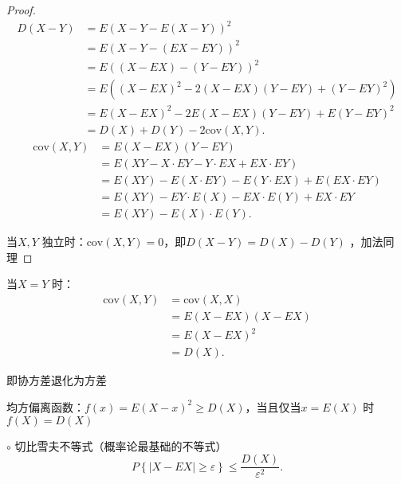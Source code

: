 \begin{proof}
    \begin{align*}
        D\left( X-Y \right) &=E\left( X-Y-E\left( X-Y \right)  \right) ^2\\
        &= E\left( X-Y-\left( EX-EY \right)  \right) ^2 \\
        &= E\left( \left( X-EX \right) -\left( Y-EY \right)  \right) ^2 \\
        &= E\left( \left( X-EX \right) ^2-2\left( X-EX \right) \left( Y-EY \right) +\left( Y-EY \right) ^2 \right)  \\
        &= E\left( X-EX \right) ^2 -2E\left( X-EX \right) \left( Y-EY \right) +E\left( Y-EY \right) ^2\\
        &= D\left( X \right) +D\left( Y \right) -2\text{cov}\left( X,Y \right)
    .\end{align*}
    \begin{align*}
        \text{cov}\left( X,Y \right) &= E\left( X-EX \right) \left( Y-EY \right)\\
        &= E\left( XY-X\cdot EY-Y\cdot EX+EX\cdot EY \right) \\
        &= E\left( XY \right) -E\left( X\cdot EY \right) -E\left( Y\cdot EX \right) +E\left( EX\cdot EY \right)  \\
        &= E\left( XY \right) -EY\cdot E\left( X \right) -EX\cdot E\left( Y \right)+EX\cdot EY  \\
        &= E\left( XY \right) -E\left( X \right) \cdot E\left( Y \right)
    .\end{align*}
    
    当$X,Y$ 独立时：$\text{cov}\left( X,Y \right) =0$，即$D\left( X-Y \right) =D\left( X \right) -D\left( Y \right) $ ，加法同理
\end{proof}
\begin{notation}
    当$X=Y$ 时：
    \begin{align*}
        \text{cov}\left( X,Y \right) &= \text{cov}\left( X,X \right) \\
        &= E\left( X-EX \right) \left( X-EX \right)  \\
        &= E\left( X-EX \right) ^2 \\
        &= D\left( X \right)
    .\end{align*}

    即协方差退化为方差
\end{notation}
\begin{notation}
    均方偏离函数：$f\left( x \right) =E\left( X-x \right) ^2\ge D\left( X \right) $，当且仅当$x=E\left( X \right) $ 时$f\left( X \right) =D\left( X \right) $
\end{notation}
$\circ$ 切比雪夫不等式（概率论最基础的不等式）
\[
    P\left\{ \left| X-EX \right| \ge \varepsilon \right\} \le \frac{D\left( X \right) }{\varepsilon^2}
.\]

